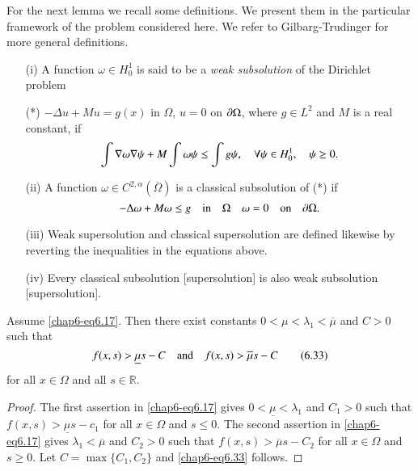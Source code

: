 \begin{remark*}
For the next lemma we recall some definitions. We present them in the
particular framework of the problem considered here. We refer to
Gilbarg-Trudinger \cite{key46} for more general definitions.
\begin{itemize}
\item[(i)] A function $\omega\in H^{1}_{0}$ is said to be a {\em weak
  subsolution} of the Dirichlet problem

\item[(*)] $-\Delta u+Mu=g(x)$ in $\Omega$, $u=0$ on $\partial \Omega$,
  where $g\in L^{2}$ and $M$ is a real constant, if
$$
\int \nabla\omega \nabla \psi+M\int \omega\psi\leq \int g\psi,\quad
\forall \psi\in H^{1}_{0},\quad \psi\geq 0.
$$

\item[(ii)] A function $\omega\in C^{2,\alpha}(\overline{\Omega})$ is
  a classical subsolution of (*) if 
$$
-\Delta \omega+M\omega\leq g\quad \text{in}\quad \Omega\quad
\omega=0\quad\text{on}\quad \partial\Omega.
$$

\item[(iii)] Weak supersolution and classical supersolution are
  defined likewise by reverting the inequalities in the equations
  above.

\item[(iv)] Every classical subsolution [supersolution] is also weak
  subsolution [supersolution].
\end{itemize}
\end{remark*}

\begin{lemma}\label{chap6-lem6.11}
Assume \eqref{chap6-eq6.17}. Then there exist constants
$0<\mu<\lambda_{1}<\overline{\mu}$ and $C>0$ such that
\begin{equation*}
f(x,s)>\underline{\mu}s-C\quad\text{and}\quad
f(x,s)>\overline{\mu}s-C\tag{6.33}\label{chap6-eq6.33} 
\end{equation*}
for all $x\in \Omega$ and all $s\in \mathbb{R}$.
\end{lemma}

\begin{proof}
The first assertion in \eqref{chap6-eq6.17} gives
$0<\underline{\mu}<\lambda_{1}$ and $C_{1}>0$ such that
$f(x,s)>\underline{\mu}s-c_{1}$ for all $x\in \Omega$ and $s\leq
0$. The second assertion in \eqref{chap6-eq6.17} gives
$\lambda_{1}<\overline{\mu}$ and $C_{2}>0$ such that
$f(x,s)>\overline{\mu}s-C_{2}$ for all $x\in \Omega$ and $s\geq
0$. Let $C=\max\{C_{1},C_{2}\}$ and \eqref{chap6-eq6.33} follows.
\end{proof}

